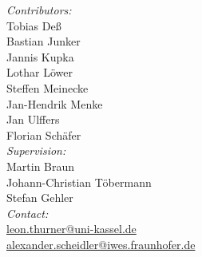 \begin{titlepage}
\textit{Contributors:} \\
Tobias Deß \\
Bastian Junker\\
Jannis Kupka \\
Lothar Löwer \\
Steffen Meinecke\\
Jan-Hendrik Menke \\
Jan Ulffers \\
Florian Schäfer \\[1em]

\textit{Supervision:}\\
Martin Braun \\
Johann-Christian Töbermann \\
Stefan Gehler \\[2em]

\flushright
\textit{Contact:} \\
\href{mailto:leon.thurner@uni-kassel.de}{leon.thurner@uni-kassel.de} \\
\hspace{1cm} \href{mailto:alexander.scheidler@iwes.fraunhofer.de}{alexander.scheidler@iwes.fraunhofer.de}




\end{titlepage}
